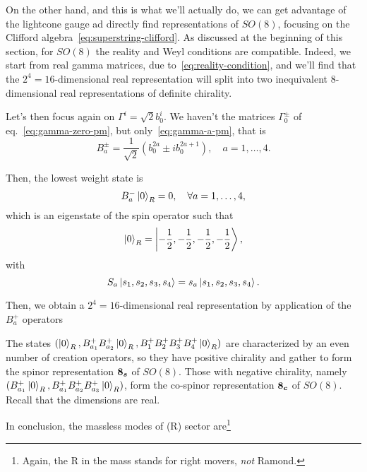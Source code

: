On the other hand, and this is what we'll actually do, we can get advantage of the lightcone gauge ad directly find representations of $SO(8)$, focusing on the Clifford algebra~\eqref{eq:superstring-clifford}. As discussed at the beginning of this section, for $SO(8)$ the reality and Weyl conditions are compatible. Indeed, we start from real gamma matrices, due to~\eqref{eq:reality-condition}, and we'll find that the $2^4=16$-dimensional real representation will split into two inequivalent $8$-dimensional real representations of definite chirality.

Let's then focus again on $\Gamma^i = \sqrt{2}b^i_0$. We haven't the matrices $\Gamma^\pm_0$ of eq.~\eqref{eq:gamma-zero-pm}, but only~\eqref{eq:gamma-a-pm}, that is
\begin{equation}\label{eq:creation-annihilation-fermion-op}
    B^\pm_a = \frac{1}{\sqrt{2}} \left( b^{2a}_0 \pm i b^{2a+1}_0 \right), \quad a = 1, \dots, 4.
\end{equation}

Then, the lowest weight state is
\begin{equation}
    B^-_a\ket{0}_{R} = 0, \quad \forall a = 1, \dots, 4,
\end{equation}
which is an eigenstate of the spin operator such that
\begin{equation}
    \ket{0}_{R} = \ket{-\frac{1}{2},-\frac{1}{2},-\frac{1}{2},-\frac{1}{2}},
\end{equation}
with
\begin{equation}
    S_a \ket{s_1,s_2,s_3,s_4} = s_a \ket{s_1,s_2,s_3,s_4}.
\end{equation}

Then, we obtain a $2^4 = 16$-dimensional real representation by application of the $B^+_a$ operators
\begin{equation*}
    
\end{equation*}

The states $(\ket{0}_{R}, B^+_{a_1}B^+_{a_2}\ket{0}_{R},B^+_{1}B^+_{2}B^+_{3}B^+_{4} \ket{0}_{R})$ are characterized by an even number of creation operators, so they have positive chirality and gather to form the spinor representation $\boldsymbol{8_s}$ of $SO(8)$. Those with negative chirality, namely $(B^+_{a_1} \ket{0}_{R}, B^+_{a_1}B^+_{a_2}B^+_{a_3}\ket{0}_{R})$, form the co-spinor representation $\boldsymbol{8_c}$ of $SO(8)$. Recall that the dimensions are real.

In conclusion, the massless modes of (R) sector are\footnote{Again, the R in the mass stands for right movers, \emph{not} Ramond.}
\begin{equation}\label{eq:table-R}
    
\end{equation}

